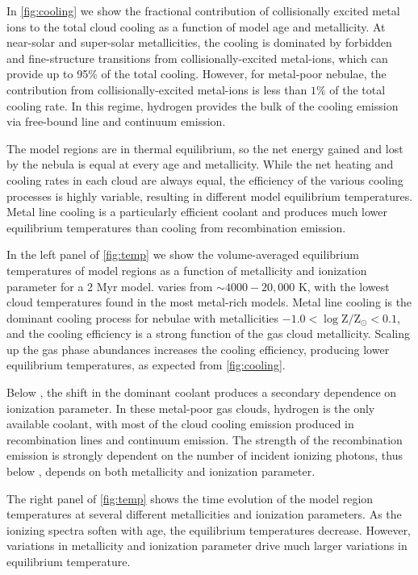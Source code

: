 In \ref{fig:cooling} we show the fractional contribution of collisionally excited metal ions to the total cloud cooling as a function of model age and metallicity. At near-solar and super-solar metallicities, the cooling is dominated by forbidden and fine-structure transitions from collisionally-excited metal-ions, which can provide up to 95\% of the total cooling. However, for metal-poor nebulae, the contribution from collisionally-excited metal-ions is less than $1\%$ of the total cooling rate. In this regime, hydrogen provides the bulk of the cooling emission via free-bound line and continuum emission.

The model \hii regions are in thermal equilibrium, so the net energy gained and lost by the nebula is equal at every age and metallicity. While the net heating and cooling rates in each cloud are always equal, the efficiency of the various cooling processes is highly variable, resulting in different model equilibrium temperatures. Metal line cooling is a particularly efficient coolant and produces much lower equilibrium temperatures than cooling from recombination emission.

In the left panel of \ref{fig:temp} we show the volume-averaged equilibrium temperatures of model \hii regions as a function of metallicity and ionization parameter for a 2 Myr model. \Te{} varies from $\sim 4000-20,000$ K, with the lowest cloud temperatures found in the most metal-rich models. Metal line cooling is the dominant cooling process for nebulae with metallicities $-1.0 < \log \mathrm{Z}/\mathrm{Z}_{\odot} < 0.1$, and the cooling efficiency is a strong function of the gas cloud metallicity. Scaling up the gas phase abundances increases the cooling efficiency, producing lower equilibrium temperatures, as expected from \ref{fig:cooling}.

Below , the shift in the dominant coolant produces a secondary dependence on ionization parameter. In these metal-poor gas clouds, hydrogen is the only available coolant, with most of the cloud cooling emission produced in recombination lines and continuum emission. The strength of the recombination emission is strongly dependent on the number of incident ionizing photons, thus below , \Te{} depends on both metallicity and ionization parameter.

The right panel of \ref{fig:temp} shows the time evolution of the model \hii region temperatures at several different metallicities and ionization parameters. As the ionizing spectra soften with age, the equilibrium temperatures decrease. However, variations in metallicity and ionization parameter drive much larger variations in equilibrium temperature.

